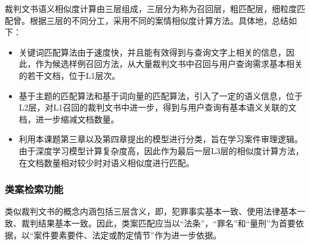 裁判文书语义相似度计算由三层组成，三层分为称为召回层，粗匹配层，细粒度匹配曾。根据三层的不同分工，采用不同的案情相似度计算方法。具体地，总结如下：
\begin{itemize}
    \item 关键词匹配算法由于速度快，并且能有效得到与查询文字上相关的信息，因此，作为候选样例召回方法，从大量裁判文书中召回与用户查询需求基本相关的若干文档，位于L1层次。
    \item 基于主题的匹配算法和基于词向量的匹配算法，引入了一定的语义信息，位于L2层，对L1召回的裁判文书中进一步，得到与用户查询有基本语义关联的文档，进一步缩减文档数量。
    \item 利用本课题第三章以及第四章提出的模型进行分类，旨在学习案件审理逻辑。由于深度学习模型计算复杂度高，因此作为最后一层L3层的相似度计算方法，在文档数量相对较少时对语义相似度进行匹配。
\end{itemize}





\subsubsection{类案检索功能}
类似裁判文书的概念内涵包括三层含义，即，犯罪事实基本一致、使用法律基本一致、裁判结果基本一致。因此，类案匹配应当以“法条”，“罪名”和“量刑”为首要依据，以“案件要素要件、法定或酌定情节”作为进一步依据。

